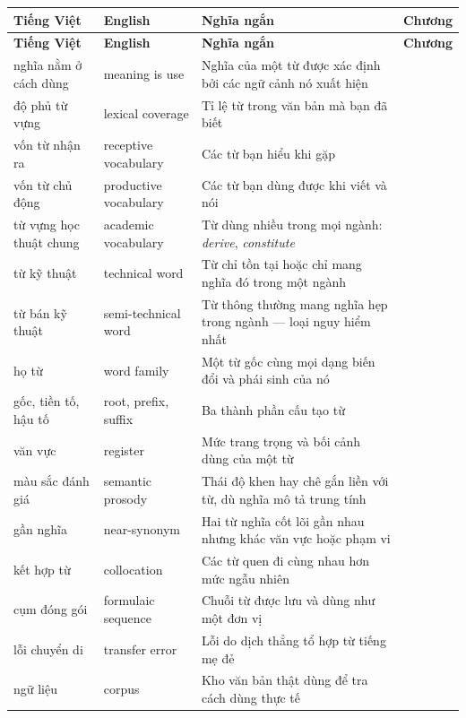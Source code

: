 \documentclass[english.tex]{subfiles}
\begin{document}
\begin{center}\footnotesize
{}
\begin{longtable}{@{}L{3.4cm}L{3.8cm}L{6.6cm}L{1.5cm}@{}}
\toprule
\textbf{Tiếng Việt} & \textbf{English} & \textbf{Nghĩa ngắn} & \textbf{Chương}\\
\midrule
\endfirsthead
\toprule
\textbf{Tiếng Việt} & \textbf{English} & \textbf{Nghĩa ngắn} & \textbf{Chương}\\
\midrule
\endhead
nghĩa nằm ở cách dùng & meaning is use & Nghĩa của một từ được xác định bởi các ngữ cảnh nó xuất hiện & \\
độ phủ từ vựng & lexical coverage & Tỉ lệ từ trong văn bản mà bạn đã biết & \\
vốn từ nhận ra & receptive vocabulary & Các từ bạn hiểu khi gặp & \\
vốn từ chủ động & productive vocabulary & Các từ bạn dùng được khi viết và nói & \\
từ vựng học thuật chung & academic vocabulary & Từ dùng nhiều trong mọi ngành: \emph{derive}, \emph{constitute} & \\
từ kỹ thuật & technical word & Từ chỉ tồn tại hoặc chỉ mang nghĩa đó trong một ngành & \\
từ bán kỹ thuật & semi-technical word & Từ thông thường mang nghĩa hẹp trong ngành --- loại nguy hiểm nhất & \\
họ từ & word family & Một từ gốc cùng mọi dạng biến đổi và phái sinh của nó & \\
gốc, tiền tố, hậu tố & root, prefix, suffix & Ba thành phần cấu tạo từ & \\
văn vực & register & Mức trang trọng và bối cảnh dùng của một từ & \\
màu sắc đánh giá & semantic prosody & Thái độ khen hay chê gắn liền với từ, dù nghĩa mô tả trung tính & \\
gần nghĩa & near-synonym & Hai từ nghĩa cốt lõi gần nhau nhưng khác văn vực hoặc phạm vi & \\
kết hợp từ & collocation & Các từ quen đi cùng nhau hơn mức ngẫu nhiên & \\
cụm đóng gói & formulaic sequence & Chuỗi từ được lưu và dùng như một đơn vị & \\
lỗi chuyển di & transfer error & Lỗi do dịch thẳng tổ hợp từ tiếng mẹ đẻ & \\
ngữ liệu & corpus & Kho văn bản thật dùng để tra cách dùng thực tế & \\
\bottomrule
\end{longtable}
\end{center}
\end{document}
